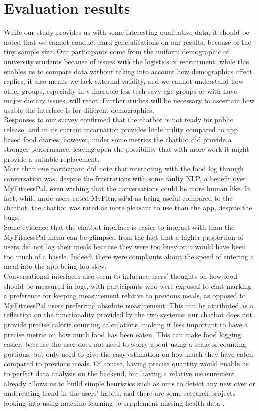 \section{Evaluation results}
While our study provides us with some interesting qualitative data, it should be noted that we cannot conduct hard generalisations on our results, because of the tiny sample size. Our participants come from the uniform demographic of university students because of issues with the logistics of recruitment; while this enables us to compare data without taking into account how demographics affect replies, it also means we lack external validity, and we cannot understand how other groups, especially in vulnerable less tech-savy age groups or with have major dietary issues, will react. Further studies will be necessary to ascertain how usable the interface is for different demographics. \\
Responses to our survey confirmed that the chatbot is not ready for public release, and in its current incarnation provides little utility compared to app based food diaries; however, under some metrics the chatbot did provide a stronger performance, leaving open the possibility that with more work it might provide a suitable replacement. \\
More than one participant did note that interacting with the food log through conversation was, despite the frustrations with some faulty NLP, a benefit over MyFitnessPal, even wishing that the conversations could be more human like. In fact, while more users rated MyFitnessPal as being useful compared to the chatbot, the chatbot was rated as more pleasant to use than the app, despite the bugs. \\
Some evidence that the chatbot interface is easier to interact with than the MyFitnessPal menu can be glimpsed from the fact that a higher proportion of users did not log their meals because they were too busy or it would have been too much of a hassle. Indeed, there were complaints about the speed of entering a meal into the app being too slow.\\
Conversational interfaces also seem to influence users' thoughts on how food should be measured in logs, with participants who were exposed to chat marking a preference for keeping measurement relative to previous meals, as opposed to MyFitnessPal users preferring absolute measurement. This can be attributed as a reflection on the functionality provided by the two systems: our chatbot does not provide precise calorie counting calculations, making it less important to have a precise metric on how much food has been eaten. This can make food logging easier, because the user does not need to worry about using a scale or counting portions, but only need to give the easy estimation on how much they have eaten compared to previous meals. Of course, having precise quantity would enable us to perfect data analysis on the backend, but having a relative measurement already allows us to build simple heuristics such as ours to detect any new over or undereating trend in the users' habits, and there are some research projects looking into using machine learning to supplement missing health data \cite{wolters}. \\
